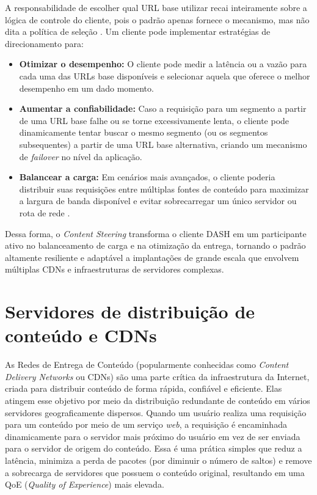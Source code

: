 A responsabilidade de escolher qual URL base utilizar recai inteiramente sobre a lógica de controle do cliente, pois o padrão apenas fornece o mecanismo, mas não dita a política de seleção \cite{sodagar2011mpegdash}. Um cliente pode implementar estratégias de direcionamento para:
\begin{itemize}
    \item \textbf{Otimizar o desempenho:} O cliente pode medir a latência ou a vazão para cada uma das URLs base disponíveis e selecionar aquela que oferece o melhor desempenho em um dado momento.
    \item \textbf{Aumentar a confiabilidade:} Caso a requisição para um segmento a partir de uma URL base falhe ou se torne excessivamente lenta, o cliente pode dinamicamente tentar buscar o mesmo segmento (ou os segmentos subsequentes) a partir de uma URL base alternativa, criando um mecanismo de \textit{failover} no nível da aplicação.
    \item \textbf{Balancear a carga:} Em cenários mais avançados, o cliente poderia distribuir suas requisições entre múltiplas fontes de conteúdo para maximizar a largura de banda disponível e evitar sobrecarregar um único servidor ou rota de rede \cite{sodagar2011mpegdash}.
\end{itemize}

Dessa forma, o \textit{Content Steering} transforma o cliente DASH em um participante ativo no balanceamento de carga e na otimização da entrega, tornando o padrão altamente resiliente e adaptável a implantações de grande escala que envolvem múltiplas CDNs e infraestruturas de servidores complexas.

\section{Servidores de distribuição de conteúdo e CDNs}

As Redes de Entrega de Conteúdo (popularmente conhecidas como \textit{Content Delivery Networks} ou CDNs) são uma parte crítica da infraestrutura da Internet, criada para distribuir conteúdo de forma rápida, confiável e eficiente. Elas atingem esse objetivo por meio da distribuição redundante de conteúdo em vários servidores geograficamente dispersos. Quando um usuário realiza uma requisição para um conteúdo por meio de um serviço \textit{web}, a requisição é encaminhada dinamicamente para o servidor mais próximo do usuário em vez de ser enviada para o servidor de origem do conteúdo. Essa é uma prática simples que reduz a latência, minimiza a perda de pacotes (por diminuir o número de saltos) e remove a sobrecarga de servidores que possuem o conteúdo original, resultando em uma QoE (\textit{Quality of Experience}) mais elevada.

